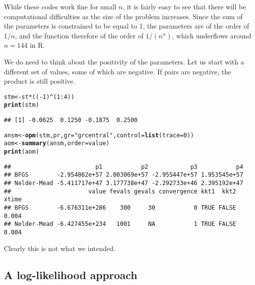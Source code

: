 \documentclass[11pt]{article}\usepackage[]{graphicx}\usepackage[]{color}
\makeatletter
\newcommand{\hlnum}[1]{\textcolor[rgb]{0.686,0.059,0.569}{#1}}%
\newcommand{\hlstr}[1]{\textcolor[rgb]{0.192,0.494,0.8}{#1}}%
\newcommand{\hlopt}[1]{\textcolor[rgb]{0,0,0}{#1}}%
\newcommand{\hlstd}[1]{\textcolor[rgb]{0.345,0.345,0.345}{#1}}%
\newcommand{\hlkwb}[1]{\textcolor[rgb]{0.69,0.353,0.396}{#1}}%
\newcommand{\hlkwc}[1]{\textcolor[rgb]{0.333,0.667,0.333}{#1}}%
\newcommand{\hlkwd}[1]{\textcolor[rgb]{0.737,0.353,0.396}{\textbf{#1}}}%
\newenvironment{kframe}{%
 \def\at@end@of@kframe{}%
 \ifinner\ifhmode%
  \def\at@end@of@kframe{\end{minipage}}%
  \begin{minipage}{\columnwidth}%
 \fi\fi%
 \def\FrameCommand##1{\hskip\@totalleftmargin \hskip-\fboxsep
 \colorbox{shadecolor}{##1}\hskip-\fboxsep
     \hskip-\linewidth \hskip-\@totalleftmargin \hskip\columnwidth}%
 \MakeFramed {\advance\hsize-\width
   \@totalleftmargin\z@ \linewidth\hsize
   \@setminipage}}%
 {\par\unskip\endMakeFramed%
 \at@end@of@kframe}
\newenvironment{knitrout}{}{} %
\newcommand{\R}{{\sf R}}
\makeatother
\begin{document}
While these codes work fine for small $n$, it is fairly easy to see that there will be 
computational difficulties as the size of the problem increases. Since the sum of the 
parameters is constrained to be equal to 1, the parameters are of the order of $1/n$,
and the function therefore of the order of $1/(n^n)$, which underflows around $n=144$ in 
\R. 

We do need to think about the positivity of the parameters. Let us start with 
a different set of values, some of which are negative. If pairs are negative, the 
product is still positive.

\begin{knitrout}\scriptsize
{}\color{fgcolor}\begin{kframe}
\begin{alltt}
\hlstd{stm} \hlkwb{<-} \hlstd{st}\hlopt{*}\hlstd{((}\hlopt{-}\hlnum{1}\hlstd{)}\hlopt{^}\hlstd{(}\hlnum{1}\hlopt{:}\hlnum{4}\hlstd{))}
\hlkwd{print}\hlstd{(stm)}
\end{alltt}
\begin{verbatim}
## [1] -0.0625  0.1250 -0.1875  0.2500
\end{verbatim}
\begin{alltt}
\hlstd{ansm}\hlkwb{<-}\hlkwd{opm}\hlstd{(stm, pr,} \hlkwc{gr}\hlstd{=}\hlstr{"grcentral"}\hlstd{,} \hlkwc{control}\hlstd{=}\hlkwd{list}\hlstd{(}\hlkwc{trace}\hlstd{=}\hlnum{0}\hlstd{))}
\hlstd{aom} \hlkwb{<-} \hlkwd{summary}\hlstd{(ansm,} \hlkwc{order}\hlstd{=value)}
\hlkwd{print}\hlstd{(aom)}
\end{alltt}
\begin{verbatim}
##                        p1           p2            p3           p4
## BFGS        -2.954862e+57 2.003069e+57 -2.955447e+57 1.953545e+57
## Nelder-Mead -5.411717e+47 3.177738e+47 -2.292733e+46 2.395192e+47
##                      value fevals gevals convergence kkt1  kkt2 xtime
## BFGS        -6.676311e+286    300     30           0 TRUE FALSE 0.004
## Nelder-Mead -6.427455e+234   1001     NA           1 TRUE FALSE 0.004
\end{verbatim}
\end{kframe}
\end{knitrout}

Clearly this is not what we intended.

\subsection{A log-likelihood approach}
\end{document}
